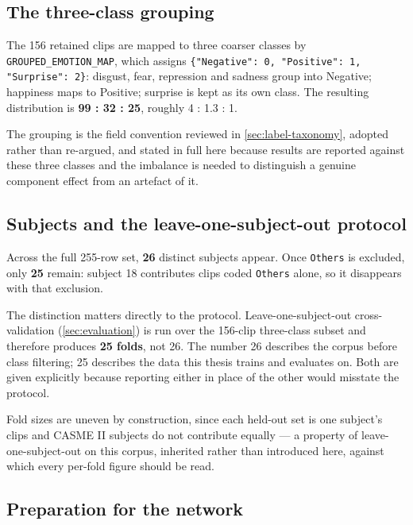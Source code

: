 \subsection{The three-class grouping}
\label{sec:three-class-grouping}

The 156 retained clips are mapped to three coarser classes by \texttt{GROUPED\_EMOTION\_MAP}, which assigns \verb|{"Negative": 0, "Positive": 1, "Surprise": 2}|: disgust, fear, repression and sadness group into Negative; happiness maps to Positive; surprise is kept as its own class. The resulting distribution is \textbf{99 : 32 : 25}, roughly 4 : 1.3 : 1.

The grouping is the field convention reviewed in \autoref{sec:label-taxonomy}, adopted rather than re-argued, and stated in full here because results are reported against these three classes and the imbalance is needed to distinguish a genuine component effect from an artefact of it.

\subsection{Subjects and the leave-one-subject-out protocol}
\label{sec:subjects-loso}

Across the full 255-row set, \textbf{26} distinct subjects appear. Once \texttt{Others} is excluded, only \textbf{25} remain: subject 18 contributes clips coded \texttt{Others} alone, so it disappears with that exclusion.

The distinction matters directly to the protocol. Leave-one-subject-out cross-validation (\autoref{sec:evaluation}) is run over the 156-clip three-class subset and therefore produces \textbf{25 folds}, not 26. The number 26 describes the corpus before class filtering; 25 describes the data this thesis trains and evaluates on. Both are given explicitly because reporting either in place of the other would misstate the protocol.

Fold sizes are uneven by construction, since each held-out set is one subject's clips and CASME II subjects do not contribute equally --- a property of leave-one-subject-out on this corpus, inherited rather than introduced here, against which every per-fold figure should be read.

\subsection{Preparation for the network}
\label{sec:network-preparation}

